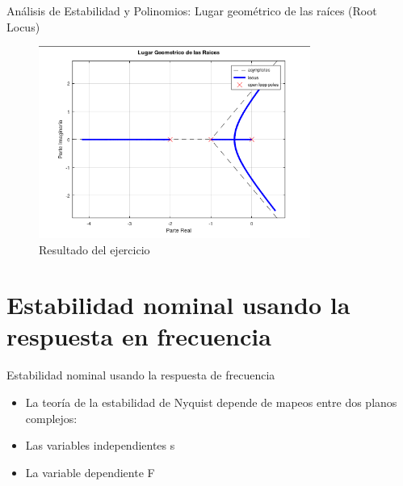 \documentclass{beamer}
\begin{document}
\begin{frame}{Análisis de Estabilidad y Polinomios: Lugar geométrico de las raíces (Root Locus)}
\begin{justify}

\begin{itemize}
    \begin{figure}[H]
    \centering
    \includegraphics[width=3.5in]{imagenes/LGRResuelto.png}
    \caption{Resultado del ejercicio}
    \label{niquist-function}
    \end{figure}   
\end{itemize}

\end{justify}
\end{frame}

\section{Estabilidad nominal usando la respuesta en frecuencia}
\begin{frame}{Estabilidad nominal usando la respuesta de frecuencia}
\begin{justify}

\begin{itemize}
    \justifying
    Una herramienta clásica para evaluar la estabilidad de un circuito de retroalimentación es la teoría de la estabilidad de Nyquist utilizando la respuesta de frecuencia del sistema en circuito abierto. Esto se logra trazando un diagrama polar del producto Go(s)C(s) y luego contando el número de círculos del punto (-1, 0). 
    Primero consideraremos una función de transferencia arbitraria F(s) (no necesariamente relacionada con el control en bucle cerrado).
    
    \vspace{0.3cm}
    \item La teoría de la estabilidad de Nyquist depende de mapeos entre dos planos complejos: 
    
    \vspace{0.3cm} 
    \item Las variables independientes s
    
    \vspace{0.3cm} 
    \item La variable dependiente F
\end{itemize}

\end{justify}
\end{frame}
\end{document}
